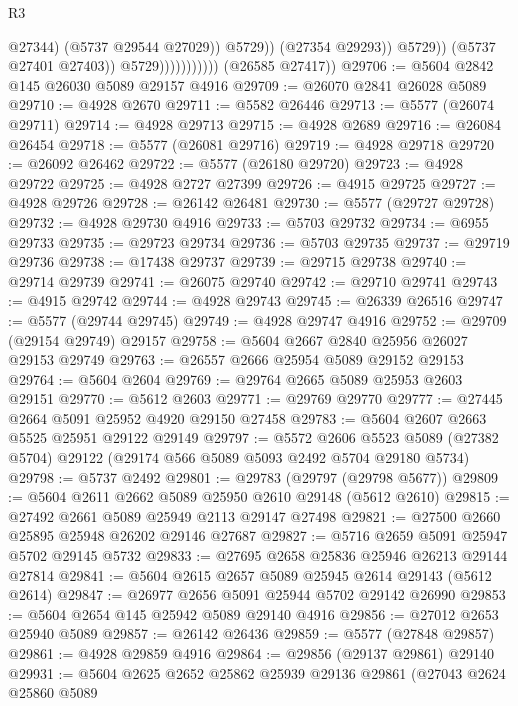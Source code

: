 \begin{lexlean}{R3}
\begin{coremodule}
                                            @27344)
                                          (@5737 @29544 @27029))
                                        @5729))
                                    (@27354 @29293))
                                  @5729))
                              (@5737 @27401 @27403))
                            @5729)))))))))))
      (@26585 @27417))
@29706 := @5604 @2842 @145 @26030 @5089 @29157 @4916
@29709 := @26070 @2841 @26028 @5089
@29710 := @4928 @2670
@29711 := @5582 @26446
@29713 := @5577 (@26074 @29711)
@29714 := @4928 @29713
@29715 := @4928 @2689
@29716 := @26084 @26454
@29718 := @5577 (@26081 @29716)
@29719 := @4928 @29718
@29720 := @26092 @26462
@29722 := @5577 (@26180 @29720)
@29723 := @4928 @29722
@29725 := @4928 @2727 @27399
@29726 := @4915 @29725
@29727 := @4928 @29726
@29728 := @26142 @26481
@29730 := @5577 (@29727 @29728)
@29732 := @4928 @29730 @4916
@29733 := @5703 @29732
@29734 := @6955 @29733
@29735 := @29723 @29734
@29736 := @5703 @29735
@29737 := @29719 @29736
@29738 := @17438 @29737
@29739 := @29715 @29738
@29740 := @29714 @29739
@29741 := @26075 @29740
@29742 := @29710 @29741
@29743 := @4915 @29742
@29744 := @4928 @29743
@29745 := @26339 @26516
@29747 := @5577 (@29744 @29745)
@29749 := @4928 @29747 @4916
@29752 := @29709 (@29154 @29749) @29157
@29758 := @5604 @2667 @2840 @25956 @26027 @29153 @29749
@29763 := @26557 @2666 @25954 @5089 @29152 @29153
@29764 := @5604 @2604
@29769 := @29764 @2665 @5089 @25953 @2603 @29151
@29770 := @5612 @2603
@29771 := @29769 @29770
@29777 := @27445 @2664 @5091 @25952 @4920 @29150 @27458
@29783 := @5604 @2607 @2663 @5525 @25951 @29122 @29149
@29797 := @5572
    @2606
    @5523
    @5089
    (@27382 @5704)
    @29122
    (@29174 @566 @5089 @5093 @2492 @5704 @29180 @5734)
@29798 := @5737 @2492
@29801 := @29783 (@29797 (@29798 @5677))
@29809 := @5604 @2611 @2662 @5089 @25950 @2610 @29148 (@5612 @2610)
@29815 := @27492 @2661 @5089 @25949 @2113 @29147 @27498
@29821 := @27500 @2660 @25895 @25948 @26202 @29146 @27687
@29827 := @5716 @2659 @5091 @25947 @5702 @29145 @5732
@29833 := @27695 @2658 @25836 @25946 @26213 @29144 @27814
@29841 := @5604 @2615 @2657 @5089 @25945 @2614 @29143 (@5612 @2614)
@29847 := @26977 @2656 @5091 @25944 @5702 @29142 @26990
@29853 := @5604 @2654 @145 @25942 @5089 @29140 @4916
@29856 := @27012 @2653 @25940 @5089
@29857 := @26142 @26436
@29859 := @5577 (@27848 @29857)
@29861 := @4928 @29859 @4916
@29864 := @29856 (@29137 @29861) @29140
@29931 := @5604
    @2625
    @2652
    @25862
    @25939
    @29136
    @29861
    (@27043
      @2624
      @25860
      @5089

\end{coremodule}
\end{lexlean}
